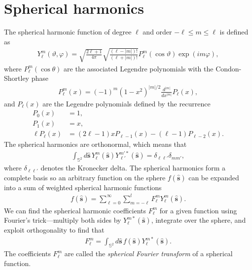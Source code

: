 \documentclass[]{osa-article}
\providecommand{\mh}[1]{\mathbf{\hat{#1}}}
\providecommand{\mbb}[1]{\mathbb{#1}}
\begin{document}

\appendix
\section{Spherical harmonics}\label{sec:sph}
The spherical harmonic function of degree $\ell$ and order $-\ell \leq m \leq \ell$
is defined as \cite{schaeffer2013}
\begin{align}
Y_\ell^m(\vartheta, \varphi) = \sqrt{\frac{2\ell+1}{4\pi}}\sqrt{\frac{(\ell-|m|)!}{(\ell+|m|)!}}P_\ell^m\left(\cos\vartheta\right)\exp(i m \varphi),
\end{align}
where $P_\ell^m(\cos\theta)$ are the associated Legendre polynomials with the
Condon-Shortley phase
\begin{align}
  P_\ell^m(x) = (-1)^m(1-x^2)^{|m|/2}\frac{d^{|m|}}{dx^{|m|}}P_\ell(x),
\end{align}
and $P_\ell(x)$ are the Legendre polynomials defined by the recurrence
\begin{align}
  P_0(x) &= 1,\\
  P_1(x) &= x,\\
  \ell P_\ell(x) &= (2\ell-1)xP_{\ell-1}(x) - (\ell-1)P_{\ell-2}(x). 
\end{align}
The spherical harmonics are orthonormal, which means that
\begin{align}
  \int_{\mbb{S}^2}d\mh{s}\, Y_\ell^m(\mh{s}){Y}_{\ell'}^{m'*}(\mh{s}) = \delta_{\ell\ell'}\delta_{mm'},
\end{align}
where $\delta_{\ell\ell'}$ denotes the Kronecker delta. The spherical harmonics form a
complete basis so an arbitrary function on the sphere $f(\mh{s})$ can be
expanded into a sum of weighted spherical harmonic functions
\begin{align}
  f(\mh{s}) = \sum_{\ell=0}^{\infty}\sum_{m=-\ell}^{l}F_\ell^mY_\ell^m(\mh{s}).
\end{align}
We can find the spherical harmonic coefficients $F_\ell^m$ for a given function
using Fourier's trick---multiply both sides by $Y_\ell^{m*}(\mh{s})$,
integrate over the sphere, and exploit orthogonality to find that
\begin{align}
  F_\ell^m = \int_{\mbb{S}^2}d\mh{s}\, f(\mh{s})Y_\ell^{m*}(\mh{s}).
\end{align}
The coefficients $F_\ell^m$ are called the \textit{spherical Fourier transform}
of a spherical function.
\end{document}

